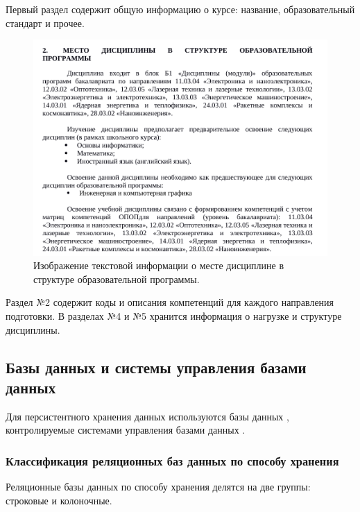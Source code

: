 Первый раздел содержит общую информацию о курсе: название, образовательный стандарт и прочее. 

\clearpage

\begin{figure}[h!]
	\begin{center}
		\includegraphics[scale=0.48]{inc/img/rpd_example_01.png}
	\end{center}
	\captionsetup{justification=centering}
	\caption{Изображение текстовой информации о месте дисциплине в структуре образовательной программы.}
	\label{img:rpd_example_02}
\end{figure}

Раздел №2 содержит коды и описания компетенций для каждого направления подготовки. В разделах №4 и №5 хранится информация о нагрузке и структуре дисциплины.

\subsection{Базы данных и системы управления базами данных}

Для персистентного хранения данных используются базы данных \cite{database}, контролируемые системами управления базами данных \cite{subd}.

\subsubsection{Классификация реляционных баз данных по способу хранения}

Реляционные базы данных по способу хранения делятся на две группы: строковые и колоночные.\\

